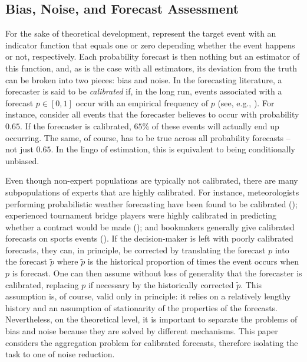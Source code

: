 \documentclass[11pt]{article}
\theoremstyle{definition}
\theoremstyle{definition}
\def\pt{\tilde{p}}
\begin{document}
\subsection{Bias, Noise, and Forecast Assessment}
\label{BiasNoise}
For the sake of theoretical development,  represent the target event with an
indicator function that equals one or zero depending whether the event
happens or not, respectively. Each probability forecast is then nothing but an
estimator of this function, and, as is the case with
all estimators, its deviation from the truth can be broken into two
pieces: bias and noise.  In the forecasting literature, a forecaster
is said to be {\em calibrated} if, in the long run, events associated
with a forecast $p \in [0,1]$ occur with an empirical frequency of $p$ (see, e.g., \citealt{degroot1983comparison}). For
instance, consider all events that the forecaster believes to occur
with probability $0.65$. If the forecaster is calibrated, $65$\% of
these events will actually end up occurring. The same, of course, has
to be true across all probability forecasts -- not just $0.65$.  
In the lingo of
estimation, this is equivalent to being conditionally unbiased.

Even though non-expert populations are typically not calibrated, there are many subpopulations of experts that are highly
calibrated. For instance, meteorologists performing probabilistic
weather forecasting have been found to be calibrated
(\citealt{murphy1977reliability}); experienced tournament bridge
players were highly calibrated in predicting whether a contract would
be made (\citealt{keren1987facing}); and bookmakers generally give
calibrated forecasts on sports events (\citealt{dowie1976efficiency,
yates1985conditional}). If the decision-maker is left with poorly
calibrated forecasts, they can, in principle, be corrected by
translating the forecast $p$ into the forecast $\pt$ where $\pt$ is
the historical proportion of times the event occurs when $p$ is
forecast.  One can then assume without loss of generality that the
forecaster is calibrated, replacing $p$ if necessary by the
historically corrected $\pt$. This assumption is, of course, valid
only in principle: it relies on a relatively lengthy history and an
assumption of stationarity of the properties of the forecasts.  
Nevertheless, on the
theoretical level, it is important to separate the problems of bias
and noise because they are solved by different mechanisms.  This
paper considers the aggregation problem for calibrated forecasts,
therefore isolating the task to one of noise reduction.
\end{document}
